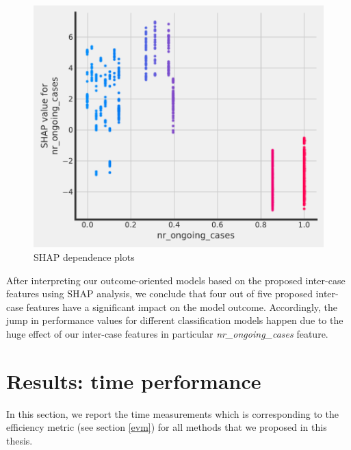 \begin{figure}[!htbp]
	\includegraphics[width=\linewidth]{images/shap/pdp_nr_ongoing.pdf}
	\caption[SHAP dependence plots]{SHAP dependence plots}
	\label{fig:shappdp}
\end{figure}\hspace*{\fill}

After interpreting our outcome-oriented models based on the proposed inter-case features using SHAP analysis, we conclude that four out of five proposed inter-case features have a significant impact on the model outcome. Accordingly, the jump in performance values for different classification models happen due to the huge effect of our inter-case features in particular \textit{nr\_ongoing\_cases} feature. 

\section{Results: time performance}
In this section, we report the time measurements which is corresponding to the efficiency metric (see section \ref{evm}) for all methods that we proposed in this thesis. 




